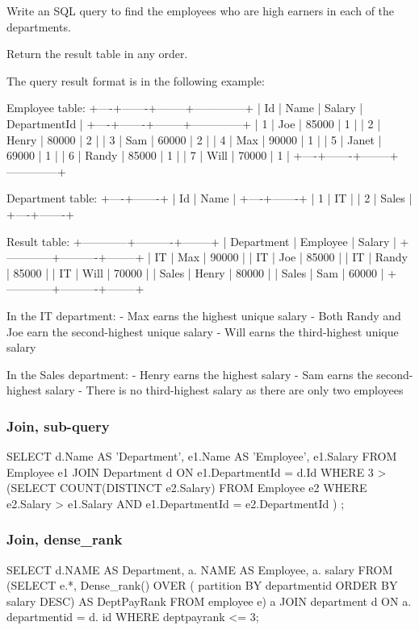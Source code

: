 Write an SQL query to find the employees who are high earners in each of the departments.

Return the result table in any order.

The query result format is in the following example:
\begin{Code}
Employee table:
+----+-------+--------+--------------+
| Id | Name  | Salary | DepartmentId |
+----+-------+--------+--------------+
| 1  | Joe   | 85000  | 1            |
| 2  | Henry | 80000  | 2            |
| 3  | Sam   | 60000  | 2            |
| 4  | Max   | 90000  | 1            |
| 5  | Janet | 69000  | 1            |
| 6  | Randy | 85000  | 1            |
| 7  | Will  | 70000  | 1            |
+----+-------+--------+--------------+

Department table:
+----+-------+
| Id | Name  |
+----+-------+
| 1  | IT    |
| 2  | Sales |
+----+-------+

Result table:
+------------+----------+--------+
| Department | Employee | Salary |
+------------+----------+--------+
| IT         | Max      | 90000  |
| IT         | Joe      | 85000  |
| IT         | Randy    | 85000  |
| IT         | Will     | 70000  |
| Sales      | Henry    | 80000  |
| Sales      | Sam      | 60000  |
+------------+----------+--------+

In the IT department:
- Max earns the highest unique salary
- Both Randy and Joe earn the second-highest unique salary
- Will earns the third-highest unique salary

In the Sales department:
- Henry earns the highest salary
- Sam earns the second-highest salary
- There is no third-highest salary as there are only two employees
\end{Code}

\subsubsection{Join, sub-query}
\begin{Code}
SELECT
    d.Name AS 'Department', e1.Name AS 'Employee', e1.Salary
FROM
    Employee e1
        JOIN
    Department d ON e1.DepartmentId = d.Id
WHERE
    3 > (SELECT
            COUNT(DISTINCT e2.Salary)
        FROM
            Employee e2
        WHERE
            e2.Salary > e1.Salary
                AND e1.DepartmentId = e2.DepartmentId
        )
;
\end{Code}

\subsubsection{Join, dense_rank}
\begin{Code}
SELECT d.NAME  AS Department,
       a. NAME AS Employee,
       a. salary
FROM   (SELECT e.*,
               Dense_rank()
                 OVER (
                   partition BY departmentid
                   ORDER BY salary DESC) AS DeptPayRank
        FROM   employee e) a
       JOIN department d
         ON a. departmentid = d. id
WHERE  deptpayrank <= 3; 
\end{Code}